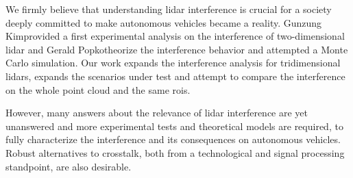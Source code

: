 We firmly believe that understanding \ac{lidar} interference is crucial for a society deeply committed to make autonomous vehicles became a reality. Gunzung Kim\etal provided a first experimental analysis on the interference of two-dimensional \ac{lidar} and Gerald Popko\etal theorize the interference behavior and attempted a Monte Carlo simulation. Our work expands the interference analysis for tridimensional \acp{lidar}, expands the scenarios under test and attempt to compare the interference on the whole point cloud and the same \acp{roi}. 

However, many answers about the relevance of \ac{lidar} interference are yet unanswered and more experimental tests and theoretical models are required, to fully characterize the interference and its consequences on autonomous vehicles. Robust alternatives to crosstalk, both from a technological and signal processing standpoint, are also desirable.

